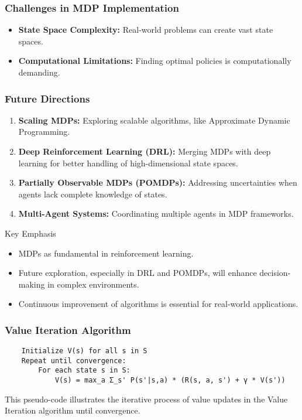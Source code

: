 \documentclass{beamer}
\begin{document}
\begin{frame}[fragile]
    \frametitle{Challenges in MDP Implementation}
    \begin{itemize}
        \item \textbf{State Space Complexity:} Real-world problems can create vast state spaces.
        \item \textbf{Computational Limitations:} Finding optimal policies is computationally demanding.
    \end{itemize}
\end{frame}

\begin{frame}[fragile]
    \frametitle{Future Directions}
    \begin{enumerate}
        \item \textbf{Scaling MDPs:} Exploring scalable algorithms, like Approximate Dynamic Programming.
        \item \textbf{Deep Reinforcement Learning (DRL):} Merging MDPs with deep learning for better handling of high-dimensional state spaces.
        \item \textbf{Partially Observable MDPs (POMDPs):} Addressing uncertainties when agents lack complete knowledge of states.
        \item \textbf{Multi-Agent Systems:} Coordinating multiple agents in MDP frameworks.
    \end{enumerate}

    \begin{block}{Key Emphasis}
        \begin{itemize}
            \item MDPs as fundamental in reinforcement learning.
            \item Future exploration, especially in DRL and POMDPs, will enhance decision-making in complex environments.
            \item Continuous improvement of algorithms is essential for real-world applications.
        \end{itemize}
    \end{block}
\end{frame}

\begin{frame}[fragile]
    \frametitle{Value Iteration Algorithm}
    \begin{lstlisting}
    Initialize V(s) for all s in S
    Repeat until convergence:
        For each state s in S:
            V(s) = max_a Σ_s' P(s'|s,a) * (R(s, a, s') + γ * V(s'))
    \end{lstlisting}
    This pseudo-code illustrates the iterative process of value updates in the Value Iteration algorithm until convergence.
\end{frame}
\end{document}
